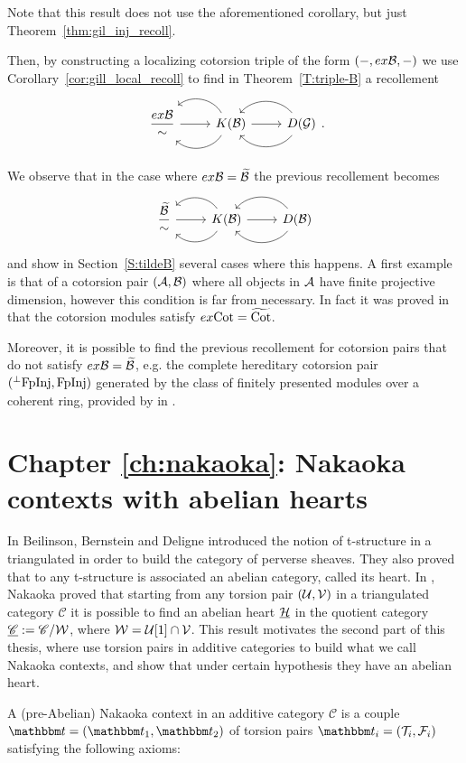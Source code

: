 Note that this result does not use the aforementioned corollary, but just Theorem~\ref{thm:gil_inj_recoll}.

Then, by constructing a localizing cotorsion triple of the form $(-,ex\mathcal{B},-)$ we use Corollary~\ref{cor:gill_local_recoll} to find in Theorem~\ref{T:triple-B} a recollement
\begin{equation*}
  \recdiagram{\dfrac{ex\B}{\sim}}{K(\B)}{D(\G)}.
\end{equation*}

We observe that in the case where $ex\mathcal{B}=\widetilde{\mathcal{B}}$ the previous recollement becomes
\begin{equation*}
  \recdiagram{\dfrac{\wac{\B}}{\sim}}{K(\B)}{D(\B)}
\end{equation*}
and show in Section~\ref{S:tildeB} several cases where this happens. A first example is that of a cotorsion pair $(\mathcal{A},\mathcal{B})$ where all objects in $\mathcal{A}$ have finite projective dimension, however this condition is far from necessary. In fact it was proved in \cite{BCIE} that the cotorsion modules satisfy $ex\mathrm{Cot}=\widetilde{\mathrm{Cot}}$.

Moreover, it is possible to find the previous recollement for cotorsion pairs that do not satisfy $ex\mathcal{B}=\widetilde{\mathcal{B}}$, e.g. the complete hereditary cotorsion pair $(^\perp\mathrm{FpInj},\mathrm{FpInj})$ generated by the class of finitely presented modules over a coherent ring, provided by \sto in \cite{Stopurity}.

\section*{Chapter \ref{ch:nakaoka}: Nakaoka contexts with abelian hearts}

In \cite{bbd82} Beilinson, Bernstein and Deligne introduced the notion of t-structure in a triangulated in order to build the category of perverse sheaves. They also proved that to any t-structure is associated an abelian category, called its heart. In \cite{Nakaoka}, Nakaoka proved that starting from any torsion pair $(\mathcal{U},\mathcal{V})$ in a triangulated category $\mathscr{C}$ it is possible to find an abelian heart $\underline{\mathcal{H}}$ in the quotient category $\underline{\mathscr{C}}:=\mathscr{C}/\mathcal{W}$, where $\mathcal{W}=\mathcal{U}[1]\cap\mathcal{V}$. This result motivates the second part of this thesis, where use torsion pairs in additive categories to build what we call Nakaoka contexts, and show that under certain hypothesis they have an abelian heart.

A (pre-Abelian) Nakaoka context in an additive category $\mathscr{C}$ is a couple $\t=(\t_1,\t_2)$ of torsion pairs $\t_i=(\T_i,\F_i)$ satisfying the following axioms:

